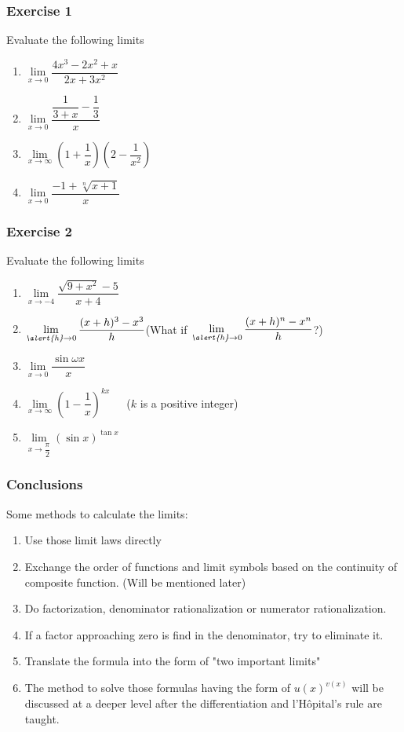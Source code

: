 \documentclass{beamer}
\begin{document}

	\begin{frame}
		\frametitle{Exercise 1}
		Evaluate the following limits\\
		\begin{enumerate}
			\item $\lim\limits_{\textit{x} \to 0}\dfrac{4x^{3}-2x^{2}+x}{2x+3x^{2}}$
			\item $\lim\limits_{\textit{x} \to 0}\dfrac{\dfrac{1}{3+x}-\dfrac{1}{3}}{x}$
			\item $\lim\limits_{\textit{x} \to \infty}(1+\dfrac{1}{x})(2-\dfrac{1}{x^{2}})$
			\item $\lim\limits_{\textit{x} \to 0}\dfrac{-1+\sqrt[n]{x+1}}{x}$
			
		\end{enumerate}
	\end{frame}
	\begin{frame}
		\frametitle{Exercise 2}
		Evaluate the following limits\\
		\begin{enumerate}
		    \item $\lim\limits_{\textit{x} \to -4}\dfrac{\sqrt{9+x^{2}}-5}{x+4}$
			\item $\lim\limits_{\textit{\alert{h}} \to 0}\dfrac{(x+h)^{3}-x^{3}}{h}$(What if $\lim\limits_{\textit{\alert{h}} \to 0}\dfrac{(x+h)^{n}-x^{n}}{h}$?)
			\item $\lim\limits_{\textit{x} \to 0}\dfrac{\sin{\omega x}}{x}$
			\item $\lim\limits_{\textit{x} \to \infty}(1-\dfrac{1}{x})^{kx}$\ \ \ ($k$ is a positive integer)
			\item $\lim\limits_{\textit{x} \to \dfrac{\pi}{2}}(\sin{x})^{\tan{x}}$
		\end{enumerate}
	\end{frame}
	\begin{frame}
		\frametitle{Conclusions}
		Some methods to calculate the limits:
		\begin{enumerate}
			\item Use those limit laws directly
			\item Exchange the order of functions and limit symbols based on the continuity of composite function. (Will be mentioned later)
			\item Do factorization, denominator rationalization or numerator rationalization.
			\item If a factor approaching zero is find in the denominator, try to eliminate it.
			\item Translate the formula into the form of "two important limits"
			\item \alert{The method to solve those formulas having the form of $u(x)^{v(x)}$ will be discussed at a deeper level after the differentiation and l'Hôpital's rule are taught.}
		\end{enumerate}
	\end{frame}
\end{document}
